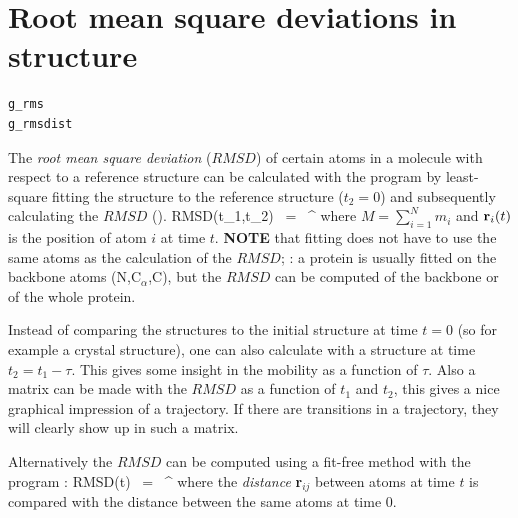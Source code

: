
\section{Root mean square deviations in structure}
\label{sec:rmsd}
\begin{verbatim}
g_rms
g_rmsdist
\end{verbatim}
The {\em root mean square deviation} ($RMSD$) of certain atoms in a molecule
with respect to a reference structure can be calculated with the program 
{\tt {}} by least-square fitting the structure to the reference structure
($t_2 = 0$) and subsequently calculating the $RMSD$ ().
\beq
RMSD(t_1,t_2) ~=~ \left[\frac{1}{M} \sum_{i=1}^N m_i \|{\bf r}_i(t_1)-{\bf r}_i(t_2)\|^2 \right]^{}
\label{eqn:rmsd}
\eeq
where $M = \sum_{i=1}^N m_i$ and ${\bf r}_i(t)$ is the position of atom $i$ at time $t$.
{\bf NOTE} that fitting does not have to use the same atoms as the calculation
of the $RMSD$; {\eg}: a protein is usually fitted on the backbone atoms
(N,C$_{\alpha}$,C), but the $RMSD$ can be computed of the backbone
or of the whole protein.

Instead of comparing the structures to the initial structure at time $t=0$ 
(so for example a crystal structure), one can also calculate  
with a structure at time $t_2=t_1-\tau$.
This gives some insight in the mobility as a function of $\tau$.
Also a matrix can be made with the $RMSD$ as a function of $t_1$ and $t_2$,
this gives a nice graphical impression of a trajectory.
If there are transitions in a trajectory, they will clearly show up in
such a matrix.

Alternatively the $RMSD$ can be computed using a fit-free method with the 
program {\tt {}}:
\beq
RMSD(t) ~=~     \left[\frac{1}{N^2}\sum_{i=1}^N \sum_{j=1}^N    \|{\bf r}_{ij}(t)-{\bf r}_{ij}(0)\|^2\right]^{}
\label{eqn:rmsdff}
\eeq
where the {\em distance} {\bf r}$_{ij}$ between atoms at time $t$ 
is compared with the distance between the same atoms at time $0$.

